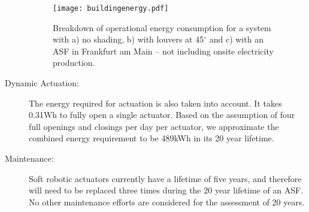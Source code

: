 \begin{description}
\begin{figure}[H]
\begin{center}
\begin{mdframed}[linecolor=cyan, linewidth=2pt]
\texttt{[image: buildingenergy.pdf]}
\caption{Breakdown of operational energy consumption for a system with a) no shading, b) with louvers at 45$^\circ$ and c) with an ASF in Frankfurt am Main -- not including onsite electricity production.}
\label{fig:operational}
\end{mdframed}
\end{center}
\end{figure}


\item[Dynamic Actuation: ] The energy required for actuation is also taken into account. It takes 0.31Wh to fully open a single actuator. Based on the assumption of four full openings and closings per day per actuator, we approximate the combined energy requirement to be 489kWh in its 20 year lifetime. 

\item[Maintenance: ] Soft robotic actuators currently have a lifetime of five years, and therefore will need to be replaced three times during the 20 year lifetime of an ASF. No other maintenance efforts are considered for the assessment of 20 years.


\end{description}
